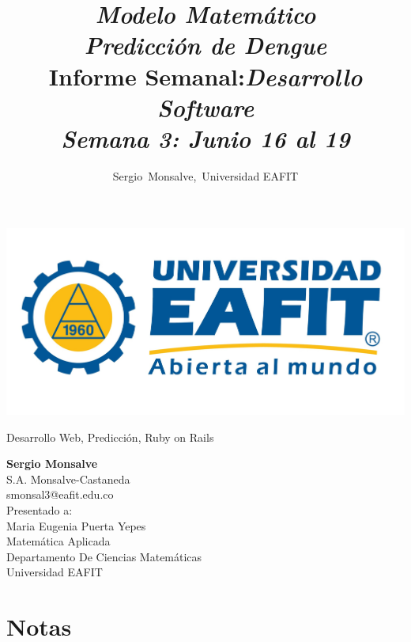 \documentclass[12pt,journal,compsoc, onecolumn]{aux/IEEEtran}
\author{Sergio~Monsalve,~Universidad EAFIT}
\title{ \textbf{\textit{Modelo Matemático\\ Predicción de Dengue}}\\
Informe Semanal:\em{Desarrollo Software}\\
Semana 3: Junio 16 al 19\\
}
\begin{document}
\pagestyle{fancyplain}
\fancyhf{}
\headheight=30pt %
\renewcommand{\headrulewidth}{0pt} %

\lhead %
{
\begin{minipage}{2cm}
\includegraphics[width=1.5 in]{aux/Logo_EAFIT.jpg}
\end{minipage}
}

\fancyfoot[c]{\thepage}

\maketitle

\begin{IEEEkeywords}
Desarrollo Web, Predicción, Ruby on Rails
\end{IEEEkeywords}

 
 \newpage
 \newpage
 \newpage

\begin{center}
\begin{IEEEbiographynophoto}{}
\textbf{Sergio Monsalve}\\
S.A. Monsalve-Castaneda \\
smonsal3@eafit.edu.co\\

Presentado a:\\
Maria Eugenia Puerta Yepes\\[0.2cm]
Matemática Aplicada\\
Departamento De Ciencias Matemáticas\\
Universidad EAFIT
\end{IEEEbiographynophoto}
\end{center}





\appendix
\chapter{Notas}

\end{document}
